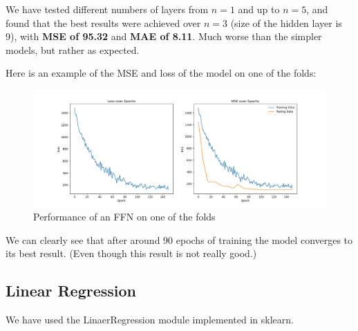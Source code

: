 \documentclass[11pt, oneside]{article}   	%
\begin{document}
We have tested different numbers of layers from $n=1$ and up to $n=5$, and found that the best results were achieved over $n=3$ (size of the hidden layer is 9), with \textbf{MSE of 95.32} and \textbf{MAE of 8.11}. Much worse than the simpler models, but rather as expected.

Here is an example of the MSE and loss of the model on one of the folds:
\begin{figure}[H]
    \begin{center}
        \includegraphics[width=\linewidth]{../plots/ffn_performance}
        \caption{Performance of an FFN on one of the folds}
    \end{center}
\end{figure}

We can clearly see that after around 90 epochs of training the model converges to its best result. (Even though this result is not really good.)

\subsection{Linear Regression}
We have used the LinaerRegression module implemented in sklearn.\\
\end{document}
